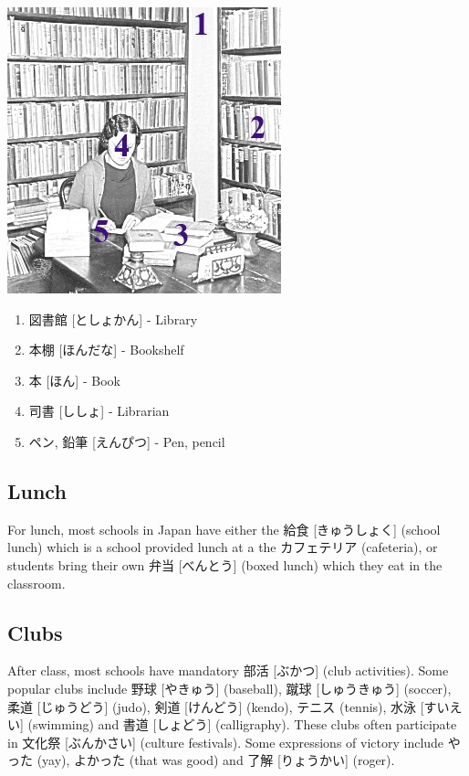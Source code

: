 \documentclass{article}
\begin{document}
\begin{CJK}{UTF8}{min}
\begin{multicols*}{3}
\includegraphics{library}

\begin{enumerate}
\item 図書館 [としょかん] - Library
\item 本棚 [ほんだな] - Bookshelf
\item 本 [ほん] - Book
\item 司書 [ししょ] - Librarian
\item ペン, 鉛筆 [えんぴつ] - Pen, pencil
\end{enumerate}

\subsection{Lunch}

For lunch, most schools in Japan have either the 給食 [きゅうしょく] (school lunch) which is a school provided lunch at a the カフェテリア (cafeteria), or students bring their own 
弁当 [べんとう] (boxed lunch) which they eat in the classroom.

\subsection{Clubs}

After class, most schools have mandatory 部活 [ぶかつ] (club activities). Some popular clubs include 野球 [やきゅう] (baseball), 蹴球 [しゅうきゅう] (soccer), 柔道 [じゅうどう] 
(judo), 剣道 [けんどう] (kendo), テニス (tennis), 水泳 [すいえい] (swimming) and 書道 [しょどう] (calligraphy). These clubs often participate in 文化祭 [ぶんかさい] (culture 
festivals). Some expressions of victory include やった (yay), よかった (that was good) and 了解 [りょうかい] (roger).


\end{multicols*}
\end{CJK}
\end{document}
